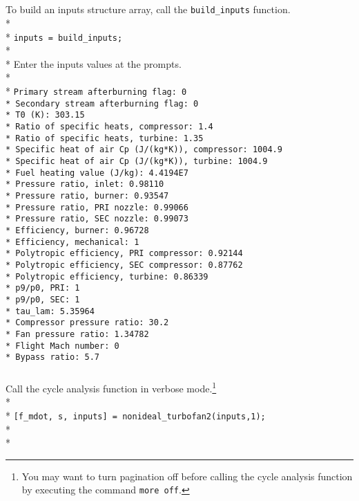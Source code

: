 \documentclass[12pt,twoside]{article}
\begin{document}
\subparagraph{}
To build an inputs structure array, call the \texttt{build\_inputs} function.\\*
\\*
\texttt{inputs = build\_inputs;}\\*
\\*
Enter the inputs values at the prompts.\\*
\\*
\texttt{Primary stream afterburning flag: 0 \\*
Secondary stream afterburning flag: 0 \\*
T0 (K): 303.15 \\*
Ratio of specific heats, compressor: 1.4 \\*
Ratio of specific heats, turbine: 1.35 \\*
Specific heat of air Cp (J/(kg*K)), compressor: 1004.9 \\*
Specific heat of air Cp (J/(kg*K)), turbine: 1004.9 \\*
Fuel heating value (J/kg): 4.4194E7 \\*
Pressure ratio, inlet: 0.98110 \\*
Pressure ratio, burner: 0.93547 \\*
Pressure ratio, PRI nozzle: 0.99066 \\*
Pressure ratio, SEC nozzle: 0.99073 \\*
Efficiency, burner: 0.96728 \\*
Efficiency, mechanical: 1 \\*
Polytropic efficiency, PRI compressor: 0.92144 \\*
Polytropic efficiency, SEC compressor: 0.87762 \\*
Polytropic efficiency, turbine: 0.86339 \\*
p9/p0, PRI: 1 \\*
p9/p0, SEC: 1 \\*
tau\_lam: 5.35964 \\*
Compressor pressure ratio: 30.2 \\*
Fan pressure ratio: 1.34782 \\*
Flight Mach number: 0 \\*
Bypass ratio: 5.7}

\subparagraph{}
Call the cycle analysis function in verbose mode.\footnote{You may want to turn pagination off before calling the cycle analysis function by executing the command \texttt{more off}.}\\*
\\*
\texttt{[f\_mdot, s, inputs] = nonideal\_turbofan2(inputs,1);}\\*
\\*
\end{document}
